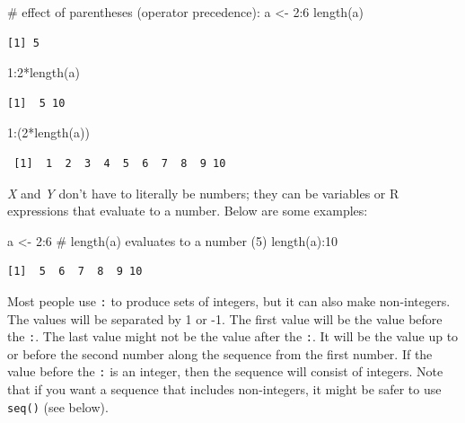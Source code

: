 \documentclass[
  13,
  letterpaper,
]{report}
\newenvironment{Shaded}{\begin{snugshade}}{\end{snugshade}}
\newcommand{\CommentTok}[1]{\textcolor[rgb]{0.37,0.37,0.37}{#1}}
\newcommand{\DecValTok}[1]{\textcolor[rgb]{0.68,0.00,0.00}{#1}}
\newcommand{\FunctionTok}[1]{\textcolor[rgb]{0.28,0.35,0.67}{#1}}
\newcommand{\NormalTok}[1]{\textcolor[rgb]{0.00,0.23,0.31}{#1}}
\newcommand{\OtherTok}[1]{\textcolor[rgb]{0.00,0.23,0.31}{#1}}
\newcommand{\SpecialCharTok}[1]{\textcolor[rgb]{0.37,0.37,0.37}{#1}}
\begin{document}
\begin{Shaded}
\begin{Highlighting}[]
\CommentTok{\# effect of parentheses (operator precedence):}
\NormalTok{a }\OtherTok{\textless{}{-}} \DecValTok{2}\SpecialCharTok{:}\DecValTok{6}
\FunctionTok{length}\NormalTok{(a)}
\end{Highlighting}
\end{Shaded}

\begin{verbatim}
[1] 5
\end{verbatim}

\begin{Shaded}
\begin{Highlighting}[]
\DecValTok{1}\SpecialCharTok{:}\DecValTok{2}\SpecialCharTok{*}\FunctionTok{length}\NormalTok{(a)}
\end{Highlighting}
\end{Shaded}

\begin{verbatim}
[1]  5 10
\end{verbatim}

\begin{Shaded}
\begin{Highlighting}[]
\DecValTok{1}\SpecialCharTok{:}\NormalTok{(}\DecValTok{2}\SpecialCharTok{*}\FunctionTok{length}\NormalTok{(a))}
\end{Highlighting}
\end{Shaded}

\begin{verbatim}
 [1]  1  2  3  4  5  6  7  8  9 10
\end{verbatim}

\emph{X} and \emph{Y} don't have to literally be numbers; they can be
variables or R expressions that evaluate to a number. Below are some
examples:

\begin{Shaded}
\begin{Highlighting}[]
\NormalTok{a }\OtherTok{\textless{}{-}} \DecValTok{2}\SpecialCharTok{:}\DecValTok{6}
\CommentTok{\# length(a) evaluates to a number (5)}
\FunctionTok{length}\NormalTok{(a)}\SpecialCharTok{:}\DecValTok{10}
\end{Highlighting}
\end{Shaded}

\begin{verbatim}
[1]  5  6  7  8  9 10
\end{verbatim}

Most people use \texttt{:} to produce sets of integers, but it can also
make non-integers. The values will be separated by 1 or -1. The first
value will be the value before the \texttt{:}. The last value might not
be the value after the \texttt{:}. It will be the value up to or before
the second number along the sequence from the first number. If the value
before the \texttt{:} is an integer, then the sequence will consist of
integers. Note that if you want a sequence that includes non-integers,
it might be safer to use \texttt{seq()} (see below).
\end{document}
